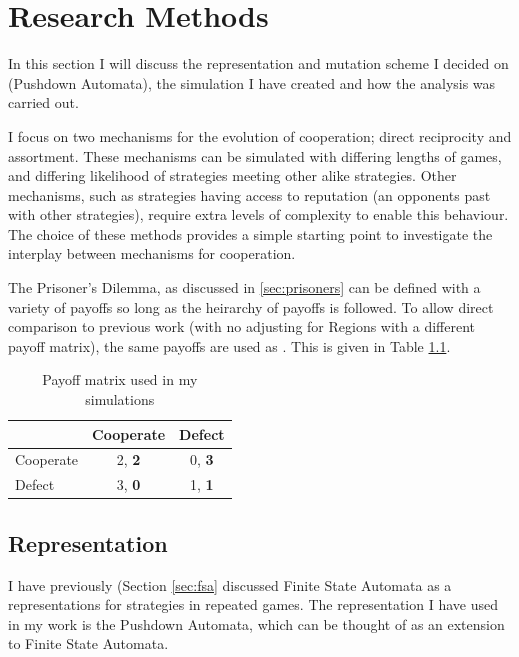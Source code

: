 \documentclass[a4paper,11pt,bcshonoursthesis,singlespace,oneside,thesisdraft,pdflatex]{cssethesis}
\begin{document}
\chapter{Research Methods}
\label{chap:researchmethods}
In this section I will discuss the representation and mutation scheme I decided on (Pushdown Automata), the simulation I have created and how the analysis was carried out.

I focus on two mechanisms for the evolution of cooperation; direct reciprocity and assortment. 
These mechanisms can be simulated with differing lengths of games, and differing likelihood of strategies meeting other alike strategies. 
Other mechanisms, such as strategies having access to reputation (an opponents past with other strategies), require extra levels of complexity to enable this behaviour. 
The choice of these methods provides a simple starting point to investigate the interplay between mechanisms for cooperation. 

The Prisoner's Dilemma, as discussed in \ref{sec:prisoners} can be defined with a variety of payoffs so long as the heirarchy of payoffs is followed. 
To allow direct comparison to previous work (with no adjusting for Regions with a different payoff matrix), the same payoffs are used as \citet{van-veelen:PNAS:2012}. 
This is given in Table \ref{table:simpayoffs}.
 
\begin{table}[h]\centering
\captionsetup{justification=centering}
\begin{tabular}{|l|c|c|}
\hline
 & \bf{Cooperate} & \bf{Defect}\\
\hline
Cooperate & 2, \bf{2} & 0, \bf{3}\\
\hline
Defect & 3, \bf{0}  & 1, \bf{1} \\
\hline
\end{tabular}
\caption{Payoff matrix used in my simulations}
\label{table:simpayoffs}
\end{table}
\section{Representation}
I have previously (Section \ref{sec:fsa} discussed Finite State Automata as a representations for strategies in repeated games. The representation I have used in my work is the Pushdown Automata, which can be thought of as an extension to Finite State Automata. 
\end{document}
